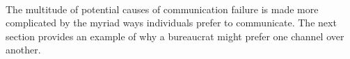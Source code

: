 

\ \\


The multitude of potential causes of communication failure is made more complicated by the myriad ways individuals prefer to communicate. The next section provides an example of why a bureaucrat might prefer one channel over another. 
 
 